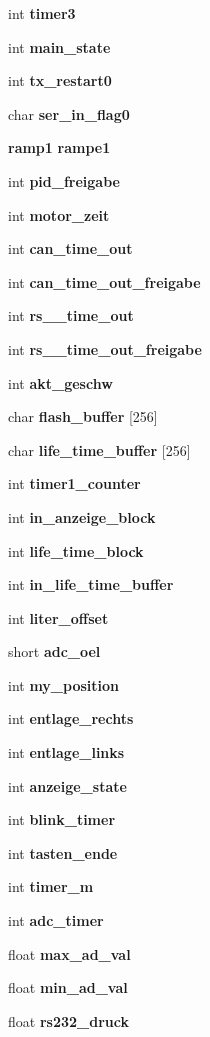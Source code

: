 \begin{DoxyCompactItemize}
int \textbf{ timer3}
\item 
int \textbf{ main\+\_\+state}
\item 
int \textbf{ tx\+\_\+restart0}
\item 
char \textbf{ ser\+\_\+in\+\_\+flag0}
\item 
\textbf{ ramp1} \textbf{ rampe1}
\item 
int \textbf{ pid\+\_\+freigabe}
\item 
int \textbf{ motor\+\_\+zeit}
\item 
int \textbf{ can\+\_\+time\+\_\+out}
\item 
int \textbf{ can\+\_\+time\+\_\+out\+\_\+freigabe}
\item 
int \textbf{ rs\+\_\+\_\+time\+\_\+out}
\item 
int \textbf{ rs\+\_\+\_\+time\+\_\+out\+\_\+freigabe}
\item 
int \textbf{ akt\+\_\+geschw}
\item 
char \textbf{ flash\+\_\+buffer} [256]
\item 
char \textbf{ life\+\_\+time\+\_\+buffer} [256]
\item 
int \textbf{ timer1\+\_\+counter}
\item 
int \textbf{ in\+\_\+anzeige\+\_\+block}
\item 
int \textbf{ life\+\_\+time\+\_\+block}
\item 
int \textbf{ in\+\_\+life\+\_\+time\+\_\+buffer}
\item 
int \textbf{ liter\+\_\+offset}
\item 
short \textbf{ adc\+\_\+oel}
\item 
int \textbf{ my\+\_\+position}
\item 
int \textbf{ entlage\+\_\+rechts}
\item 
int \textbf{ entlage\+\_\+links}
\item 
int \textbf{ anzeige\+\_\+state}
\item 
int \textbf{ blink\+\_\+timer}
\item 
int \textbf{ tasten\+\_\+ende}
\item 
int \textbf{ timer\+\_\+m}
\item 
int \textbf{ adc\+\_\+timer}
\item 
float \textbf{ max\+\_\+ad\+\_\+val}
\item 
float \textbf{ min\+\_\+ad\+\_\+val}
\item 
float \textbf{ rs232\+\_\+druck}
\end{DoxyCompactItemize}


